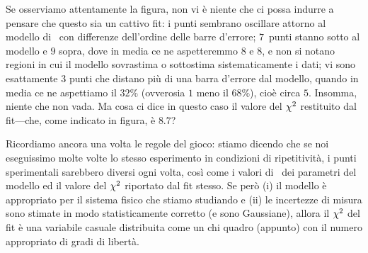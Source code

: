 
Se osserviamo attentamente la figura, non vi è niente che ci possa indurre a
pensare che questo sia un cattivo fit: i punti sembrano oscillare attorno al
modello di \bestfit\ con differenze dell'ordine delle barre d'errore;
$7$~punti stanno sotto al modello e $9$ sopra, dove in media ce ne aspetteremmo
$8$ e $8$, e non si notano regioni in cui il modello sovrastima o sottostima
sistematicamente i dati; vi sono esattamente $3$ punti che distano
più di una barra d'errore dal modello, quando in media ce ne aspettiamo il
$32\%$ (ovverosia $1$ meno il $68\%$), cioè circa $5$. Insomma, niente che
non vada. Ma cosa ci dice in questo caso il valore del $\chi^2$ restituito dal
fit---che, come indicato in figura, è $8.7$?

Ricordiamo ancora una volta le regole del gioco: stiamo dicendo che se noi
eseguissimo molte volte lo stesso esperimento in condizioni di ripetitività,
i punti sperimentali sarebbero diversi ogni volta, così come i valori di
\bestfit\ dei parametri del modello ed il valore del $\chi^2$ riportato
dal fit stesso. Se però (i) il modello è appropriato per il sistema fisico
che stiamo studiando e (ii) le incertezze di misura sono stimate in modo
statisticamente corretto (e sono Gaussiane), allora il $\chi^2$ del fit
è una variabile casuale distribuita come un chi quadro (appunto) con il numero
appropriato di gradi di libertà.

